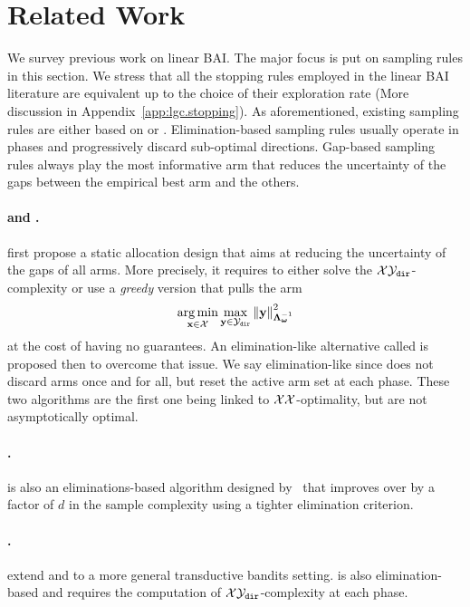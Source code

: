 \section{Related Work}\label{sec:lgc.related_work}

We survey previous work on linear BAI. The major focus is put on sampling rules in this section. We stress that all the stopping rules employed in the linear BAI literature are equivalent up to the choice of their exploration rate (More discussion in Appendix~\ref{app:lgc.stopping}). As aforementioned, existing sampling rules are either based on \SE or \UGapE. Elimination-based sampling rules usually operate in phases and progressively discard sub-optimal directions. Gap-based sampling rules always play the most informative arm that reduces the uncertainty of the gaps between the empirical best arm and the others.

\paragraph{\XYS and \XYA.} \citet{soare2014linear} first propose a static allocation design \XYS that aims at reducing the uncertainty of the gaps of all arms. More precisely, it requires to either solve the $\mathcal{X}\mathcal{Y}_{\texttt{dir}}$-complexity or use a \emph{greedy} version that pulls the arm 
\[
    \operatorname*{arg\,min}_{{\bf x}\in\mathcal{X}} \max_{{\bf y}\in\mathcal{Y}_{\texttt{dir}}} \left\lVert{\bf y}\right\rVert_{{\boldsymbol \Lambda}_{{\boldsymbol \omega}}^{-1}}^2
\]
at the cost of having no guarantees. An elimination-like alternative called \XYA is proposed then to overcome that issue. We say elimination-like since \XYA does not discard arms once and for all, but reset the active arm set at each phase. These two algorithms are the first one being linked to $\mathcal{X}\mathcal{X}$-optimality, but are not asymptotically optimal.

\paragraph{\ALBA.} \ALBA is also an eliminations-based algorithm designed by~\citet{tao2018alba} that improves over \XYA by a factor of $d$ in the sample complexity using a tighter elimination criterion.
\vspace{-0.2cm}

\paragraph{\RAGE.} \citet{fiez2019transductive} extend \XYS and \XYA to a more general transductive bandits setting. \RAGE is also elimination-based and requires the computation of $\mathcal{X}\mathcal{Y}_{\texttt{dir}}$-complexity at each phase.

